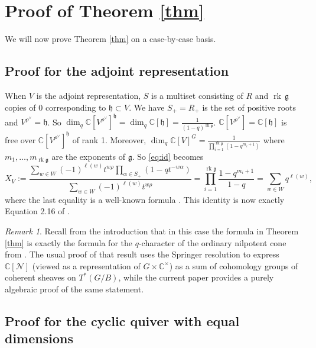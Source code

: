 \documentclass[12pt]{article}
\newcommand{\C}{\mathbb{C}}
\DeclareMathOperator{\rk}{rk}
\theoremstyle{definition}
\theoremstyle{remark}
\newtheorem{remark}[theorem]{Remark}
\newcommand{\g}{\mathfrak{g}}
\newcommand{\N}{\mathcal{N}}
\newcommand{\h}{\mathfrak{h}}
\begin{document}
\section{Proof of Theorem \ref{thm}}\label{sec:cases}

We will now prove Theorem \ref{thm} on a case-by-case basis.

\subsection{Proof for the adjoint representation}

When $V$ is the adjoint representation, $S$ is a multiset consisting of $R$ and $\rk\,\g$ copies of 0 corresponding to $\h\subset V$. We have $S_+=R_+$ is the set of positive roots and $V^{\rho^\vee}=\h$. So $\dim_q\C[V^{\rho^\vee}]^\h=\dim_q\C[\h]=\frac{1}{(1-q)^{\rk\g}}$. $\C[V^{\rho^\vee}]=\C[\h]$ is free over $\C[V^{\rho^\vee}]^\h$ of rank 1. Moreover, $\dim_q\C[V]^G=\frac{1}{\prod_{i=1}^{\rk\g}(1-q^{m_i+1})}$ where $m_1,\dots,m_{\rk\g}$ are the exponents of $\g$. So \eqref{eq:id} becomes
\[X_V:=\frac{\sum_{w\in W}(-1)^{\ell(w)}t^{w\rho}\prod_{\alpha\in S_+}(1-qt^{-w\alpha})}{\sum_{w\in W}(-1)^{\ell(w)}t^{w\rho}}=\prod_{i=1}^{\rk\g}\frac{1-q^{m_i+1}}{1-q}=\sum_{w\in W}q^{\ell(w)},\]
where the last equality is a well-known formula \cite[Theorem 3.15]{humphreys1992reflection}. This identity is now exactly Equation 2.16 of \cite{macdonald}.

\begin{remark}
    Recall from the introduction that in this case the formula in Theorem \ref{thm} is exactly the formula for the $q$-character of the ordinary nilpotent cone from \cite{mcgovern1989}. The usual proof of that result uses the Springer resolution to express $\C[\N]$ (viewed as a representation of $G\times\C^\times$) as a sum of cohomology groups of coherent sheaves on $T^*(G/B)$, while the current paper provides a purely algebraic proof of the same statement.
\end{remark}

\subsection{Proof for the cyclic quiver with equal dimensions}\label{sec:eqdim}
\end{document}
